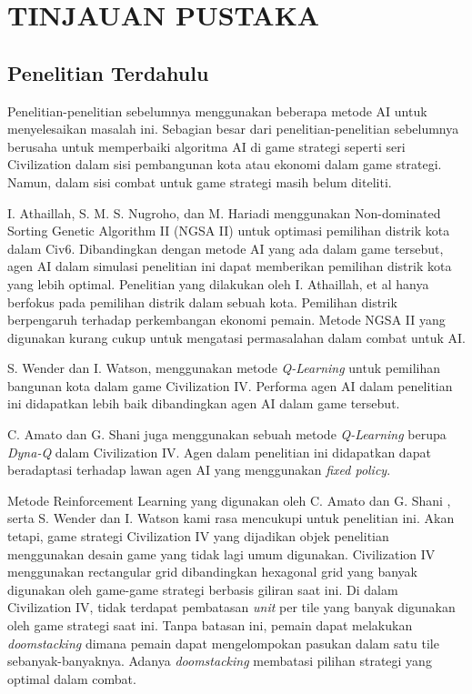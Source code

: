 \chapter{TINJAUAN PUSTAKA}
\label{chap:tinjauanpustaka}


\section{Penelitian Terdahulu}
\label{sec:penelitianterdahulu}

Penelitian-penelitian sebelumnya menggunakan beberapa metode AI untuk menyelesaikan masalah ini. Sebagian besar dari penelitian-penelitian sebelumnya berusaha untuk memperbaiki algoritma AI di game strategi seperti seri Civilization dalam sisi pembangunan kota atau ekonomi dalam game strategi. Namun, dalam sisi combat untuk game strategi masih belum diteliti.

I. Athaillah, S. M. S. Nugroho, dan M. Hariadi menggunakan Non-dominated Sorting Genetic Algorithm II (NGSA II) untuk optimasi pemilihan distrik kota dalam Civ6. Dibandingkan dengan metode AI yang ada dalam game tersebut, agen AI dalam simulasi penelitian ini dapat memberikan pemilihan distrik kota yang lebih optimal. Penelitian yang dilakukan oleh I. Athaillah, et al hanya berfokus pada pemilihan distrik dalam sebuah kota. Pemilihan distrik berpengaruh terhadap perkembangan ekonomi pemain. Metode NGSA II yang digunakan kurang cukup untuk mengatasi permasalahan dalam combat untuk AI. 

S. Wender dan I. Watson, menggunakan metode \emph{Q-Learning} untuk pemilihan bangunan kota dalam game Civilization IV. Performa agen AI dalam penelitian ini didapatkan lebih baik dibandingkan agen AI dalam game tersebut.

C. Amato dan G. Shani juga menggunakan sebuah metode \emph{Q-Learning} berupa \emph{Dyna-Q} dalam Civilization IV. Agen dalam penelitian ini didapatkan dapat beradaptasi terhadap lawan agen AI yang menggunakan \emph{fixed policy}.

Metode Reinforcement Learning yang digunakan oleh C. Amato dan G. Shani \citep{civ4RL}, serta S. Wender dan I. Watson kami rasa mencukupi untuk penelitian ini. Akan tetapi, game strategi Civilization IV yang dijadikan objek penelitian menggunakan desain game yang tidak lagi umum digunakan. Civilization IV menggunakan rectangular grid dibandingkan hexagonal grid yang banyak digunakan oleh game-game strategi berbasis giliran saat ini. Di dalam Civilization IV, tidak terdapat pembatasan \emph{unit} per tile yang banyak digunakan oleh game strategi saat ini. Tanpa batasan ini, pemain dapat melakukan \emph{doomstacking} dimana pemain dapat mengelompokan pasukan dalam satu tile sebanyak-banyaknya. Adanya \emph{doomstacking} membatasi pilihan strategi yang optimal dalam combat.

